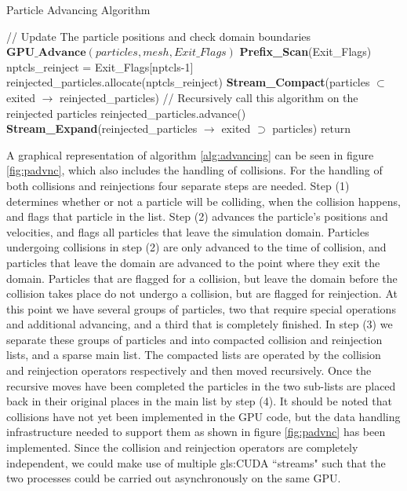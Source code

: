 \begin{algorithm}
	\caption{Particle Advancing Algorithm}
	\label{alg:advancing}
	\begin{algorithmic}
		\STATE // Update The particle positions and check domain boundaries
		\STATE $\textbf{GPU\_Advance}(particles,mesh,Exit\_Flags)$
		\STATE
		\STATE \textbf{Prefix\_Scan}(Exit\_Flags)
		\STATE
		\STATE nptcls\_reinject = Exit\_Flags[nptcls-1]
		\STATE
			\STATE
			\STATE reinjected\_particles.allocate(nptcls\_reinject)
			\STATE
			\STATE \textbf{Stream\_Compact}(particles $\subset$ exited $\rightarrow$ reinjected\_particles)
			\STATE
			\STATE // Recursively call this algorithm on the reinjected particles
			\STATE reinjected\_particles.advance()
			\STATE
			\STATE \textbf{Stream\_Expand}(reinjected\_particles $\rightarrow$ exited $\supset$ particles)
		\ENDIF
		\STATE
		\STATE return
	\end{algorithmic}
\end{algorithm}

A graphical representation of algorithm \ref{alg:advancing} can be seen in figure \ref{fig:padvnc}, which also includes the handling of collisions. For the handling of both collisions and reinjections four separate steps are needed. Step (1) determines whether or not a particle will be colliding, when the collision happens, and flags that particle in the list. Step (2) advances the particle's positions and velocities, and flags all particles that leave the simulation domain. Particles undergoing collisions in step (2) are only advanced to the time of collision, and particles that leave the domain are advanced to the point where they exit the domain. Particles that are flagged for a collision, but leave the domain before the collision takes place do not undergo a collision, but are flagged for reinjection. At this point we have several groups of particles, two that require special operations and additional advancing, and a third that is completely finished. 
In step (3) we separate these groups of particles and into compacted collision and reinjection lists, and a sparse main list. The compacted lists are operated by the collision and reinjection operators respectively and then moved recursively. 
Once the recursive moves have been completed the particles in the two sub-lists are placed back in their original places in the main list by step (4). It should be noted that collisions have not yet been implemented in the GPU code, but the data handling infrastructure needed to support them as shown in figure \ref{fig:padvnc} has been implemented. 
Since the collision and reinjection operators are completely independent, we could make use of multiple \gls{gls:CUDA} ``streams" such that the two processes could be carried out asynchronously on the same GPU. 

